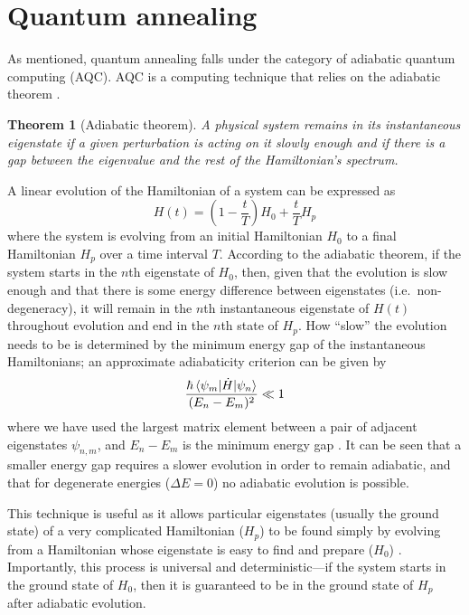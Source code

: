 \documentclass[twocolumn]{article}
\newtheorem*{theorem}{Theorem}
\theoremstyle{definition}
\begin{document}
\section{Quantum annealing}

As mentioned, quantum annealing falls under the category of adiabatic quantum computing (AQC). AQC is a computing technique that relies on the adiabatic theorem \cite{born_beweis_1928}.

\begin{theorem}[Adiabatic theorem]
    A physical system remains in its instantaneous eigenstate if a given perturbation is acting on it slowly enough and if there is a gap between the eigenvalue and the rest of the Hamiltonian's spectrum.
    \label{thm:adiabatic}
\end{theorem}

A linear evolution of the Hamiltonian of a system can be expressed as
\begin{equation}
    H(t)=\left(1- \frac{t}{T}\right)H_0 + \frac{t}{T}H_p
    \label{eq:time-evolution}
\end{equation}
where the system is evolving from an initial Hamiltonian $H_0$ to a final Hamiltonian $H_p$ over a time interval $T$. According to the adiabatic theorem, if the system starts in the $n$th eigenstate of $H_0$, then, given that the evolution is slow enough and that there is some energy difference between eigenstates (i.e.\ non-degeneracy), it will remain in the $n$th instantaneous eigenstate of $H(t)$ throughout evolution and end in the $n$th state of $H_p$. How ``slow'' the evolution needs to be is determined by the minimum energy gap of the instantaneous Hamiltonians; an approximate adiabaticity criterion can be given by
\begin{equation}
    \frac{\hbar\braket{\psi_m|\dot{H}|\psi_n}}{(E_n-E_m)^2} \ll 1
    \label{eq:energy-gap}
\end{equation}
where we have used the largest matrix element between a pair of adjacent eigenstates $\psi_{n,m}$, and ${E_n-E_m}$ is the minimum energy gap \cite{sakurai_quantum_2020}. It can be seen that a smaller energy gap requires a slower evolution in order to remain adiabatic, and that for degenerate energies ($\Delta E=0$) no adiabatic evolution is possible.

This technique is useful as it allows particular eigenstates (usually the ground state) of a very complicated Hamiltonian ($H_p$) to be found simply by evolving from a Hamiltonian whose eigenstate is easy to find and prepare ($H_0$) \cite{farhi_quantum_2001}. Importantly, this process is universal and deterministic---if the system starts in the ground state of $H_0$, then it is guaranteed to be in the ground state of $H_p$ after adiabatic evolution.
\end{document}
